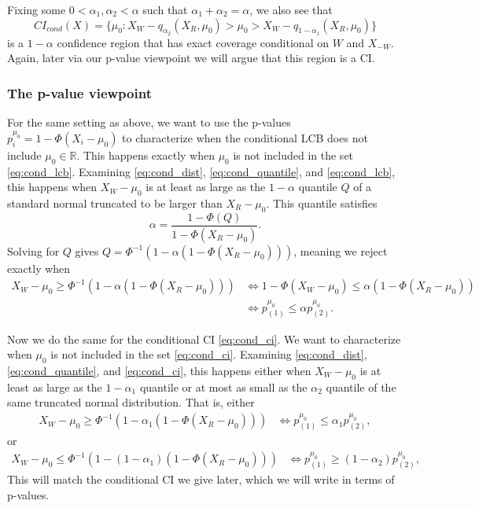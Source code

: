 \documentclass{article}
\newcommand{\R}{\mathbb{R}}
\begin{document}
\begin{appendix}
Fixing some $0 < \alpha_1, \alpha_2 < \alpha$ such that $\alpha_1 + \alpha_2 = \alpha$, we also see that 
\begin{equation}
    \label{eq:cond_ci}
        CI_{cond}(X) = \{\mu_0 : X_W - q_{\alpha_2}(X_R, \mu_0) > \mu_0 > X_W - q_{1-\alpha_1}(X_R, \mu_0)  \} 
\end{equation}
is a $1-\alpha$ confidence region that has exact coverage conditional on $W$ and $X_{-W}$. Again, later via our p-value viewpoint we will argue that this region is a CI. 

\subsubsection{The p-value viewpoint }

For the same setting as above, we want to use the p-values $p^{\mu_0}_i = 1 - \Phi(X_i - \mu_0)$ to characterize when the conditional LCB does not include $\mu_0 \in \R$. This happens exactly when $\mu_0$ is not included in the set \eqref{eq:cond_lcb}. Examining \eqref{eq:cond_dist}, \eqref{eq:cond_quantile}, and \eqref{eq:cond_lcb}, this happens when $X_W - \mu_0$ is at least as large as the $1-\alpha$ quantile $Q$ of a standard normal truncated to be larger than $X_R - \mu_0$. This quantile satisfies 
    \begin{equation*}
        \alpha = \frac{1 - \Phi(Q) }{1 - \Phi(X_R - \mu_0) }.
    \end{equation*}
Solving for $Q$ gives $Q = \Phi^{-1}(1 - \alpha(1 - \Phi(X_R - \mu_0)))$, meaning we reject exactly when 
\begin{align*}
    X_{W} - \mu_0 \geq \Phi^{-1}(1 - \alpha(1 - \Phi(X_{R} - \mu_0))) &\iff 1 - \Phi(X_{W} - \mu_0) \leq \alpha(1 - \Phi(X_{R} - \mu_0))\\
    &\iff p^{\mu_0}_{(1)} \leq \alpha p^{\mu_0}_{(2)}.
\end{align*}

Now we do the same for the conditional CI \eqref{eq:cond_ci}. We want to characterize when $\mu_0$ is not included in the set \eqref{eq:cond_ci}. Examining \eqref{eq:cond_dist}, \eqref{eq:cond_quantile}, and \eqref{eq:cond_ci}, this happens either when $X_W - \mu_0$ is at least as large as the $1-\alpha_1$ quantile or at most as small as the $\alpha_2$ quantile of the same truncated normal distribution. That is, either 
\begin{align*}
    X_{W} - \mu_0 \geq \Phi^{-1}(1 - \alpha_1(1 - \Phi(X_{R} - \mu_0))) & \iff p^{\mu_0}_{(1)} \leq \alpha_1 p^{\mu_0}_{(2)},
\end{align*}
or 
\begin{align*}
    X_{W} - \mu_0 \leq \Phi^{-1}(1 - (1-\alpha_1)(1 - \Phi(X_{R} - \mu_0))) & \iff p^{\mu_0}_{(1)} \geq (1-\alpha_2) p^{\mu_0}_{(2)},
\end{align*}
This will match the conditional CI we give later, which we will write in terms of p-values.


\end{appendix}
\end{document}
